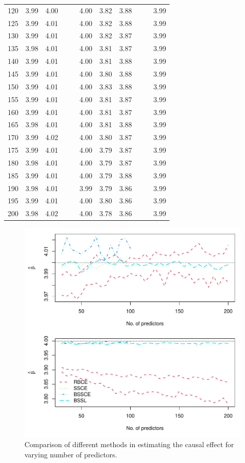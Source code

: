 \documentclass[preprint,12pt]{elsarticle}
\begin{document}
\begin{table}[ht]
\begin{tabular}{c|ccccc|ccccc}
  120 & 3.99 & 4.00 &  &  & 4.00 & 3.82 & 3.88 &  &  & 3.99 \\ 
  125 & 3.99 & 4.01 &  &  & 4.00 & 3.82 & 3.88 &  &  & 3.99 \\ 
  130 & 3.99 & 4.01 &  &  & 4.00 & 3.82 & 3.87 &  &  & 3.99 \\ 
  135 & 3.98 & 4.01 &  &  & 4.00 & 3.81 & 3.87 &  &  & 3.99 \\ 
  140 & 3.99 & 4.01 &  &  & 4.00 & 3.81 & 3.88 &  &  & 3.99 \\ 
  145 & 3.99 & 4.01 &  &  & 4.00 & 3.80 & 3.88 &  &  & 3.99 \\ 
  150 & 3.99 & 4.01 &  &  & 4.00 & 3.83 & 3.88 &  &  & 3.99 \\ 
  155 & 3.99 & 4.01 &  &  & 4.00 & 3.81 & 3.87 &  &  & 3.99 \\ 
  160 & 3.99 & 4.01 &  &  & 4.00 & 3.81 & 3.87 &  &  & 3.99 \\ 
  165 & 3.98 & 4.01 &  &  & 4.00 & 3.81 & 3.88 &  &  & 3.99 \\ 
  170 & 3.99 & 4.02 &  &  & 4.00 & 3.80 & 3.87 &  &  & 3.99 \\ 
  175 & 3.99 & 4.01 &  &  & 4.00 & 3.79 & 3.87 &  &  & 3.99 \\ 
  180 & 3.98 & 4.01 &  &  & 4.00 & 3.79 & 3.87 &  &  & 3.99 \\ 
  185 & 3.99 & 4.01 &  &  & 4.00 & 3.79 & 3.88 &  &  & 3.99 \\ 
  190 & 3.98 & 4.01 &  &  & 3.99 & 3.79 & 3.86 &  &  & 3.99 \\ 
  195 & 3.99 & 4.01 &  &  & 4.00 & 3.80 & 3.86 &  &  & 3.99 \\ 
  200 & 3.98 & 4.02 &  &  & 4.00 & 3.78 & 3.86 &  &  & 3.99 \\ 
   \hline
\end{tabular}
\end{table}\begin{figure}
    \centering
    \includegraphics[width = 0.9\linewidth]{treat_pred.pdf}
    \caption{Comparison of different methods in estimating the causal effect for varying number of predictors.}
    \label{fig:comp:trt:pred}
\end{figure}
\end{document}
